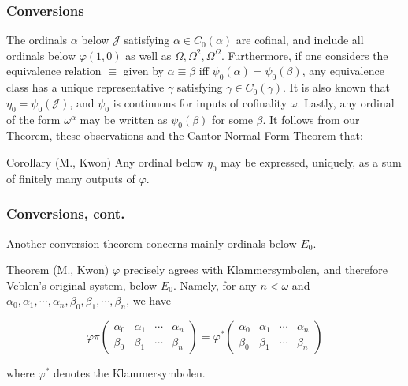 \documentclass{beamer}
\begin{document}
\begin{frame}
\frametitle{Conversions}
The ordinals $\alpha$ below $\mathcal{J}$ satisfying $\alpha \in C_0(\alpha)$ are cofinal, and include all ordinals below $\varphi(1,0)$ as well as $\Omega, \Omega^2, \Omega^\Omega$. Furthermore, if one considers the equivalence relation $\equiv$ given by $\alpha \equiv \beta$ iff $\psi_0(\alpha) = \psi_0(\beta)$, any equivalence class has a unique representative $\gamma$ satisfying $\gamma \in C_0(\gamma)$. It is also known that $\eta_0 = \psi_0(\mathcal{J})$, and $\psi_0$ is continuous for inputs of cofinality $\omega$. Lastly, any ordinal of the form $\omega^\alpha$ may be written as $\psi_0(\beta)$ for some $\beta$. \pause It follows from our Theorem, these observations and the Cantor Normal Form Theorem that:

\begin{block}{Corollary (M., Kwon)}
Any ordinal below $\eta_0$ may be expressed, uniquely, as a sum of finitely many outputs of $\varphi$.
\end{block}
\end{frame}

\begin{frame}
\frametitle{Conversions, cont.}
Another conversion theorem concerns mainly ordinals below $E_0$.

\begin{block}{Theorem (M., Kwon)}
$\varphi$ precisely agrees with Klammersymbolen, and therefore Veblen's original system, below $E_0$. Namely, for any $n < \omega$ and $\alpha_0, \alpha_1, \cdots, \alpha_n, \beta_0, \beta_1, \cdots, \beta_n$, we have

\begin{equation}
\varphi \pi \left(\begin{matrix} \alpha_0 & \alpha_1 & \cdots & \alpha_n \\ \beta_0 & \beta_1 & \cdots & \beta_n \end{matrix}\right) = \varphi^* \left(\begin{matrix} \alpha_0 & \alpha_1 & \cdots & \alpha_n \\ \beta_0 & \beta_1 & \cdots & \beta_n \end{matrix}\right)
\end{equation}

where $\varphi^*$ denotes the Klammersymbolen.
\end{block}
\end{frame}
\end{document}
